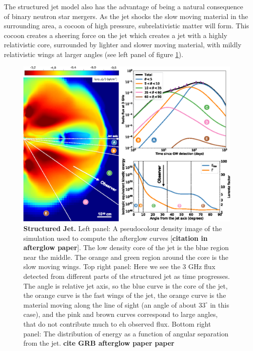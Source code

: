 \documentclass[11pt]{cuthesis}
\begin{document}
The structured jet model also has the advantage of being a natural consequence of binary neutron star mergers. As the jet shocks the slow moving material in the surrounding area, a cocoon of high pressure, subrelativistic matter will form. This cocoon creates a sheering force on the jet which creates a jet with a highly relativistic core, surrounded by lighter and slower moving material, with mildly relativistic wings at larger angles (see left panel of figure \ref{fig:structured jet}). 

\begin{figure} %
\begin{center}
\includegraphics[width=1.0\linewidth]{structured_jet.png}
\end{center}
\caption{\textbf{Structured Jet.} Left panel: A pseudocolour density image of the simulation used to compute the afterglow curves [\textbf{citation in afterglow paper}]. The low density core of the jet is the blue region near the middle. The orange and green region around the core is the slow moving wings.  Top right panel: Here we see the 3 GHz flux detected from different parts of the structured jet as time progresses. The angle is relative jet axis, so the blue curve is the core of the jet, the orange curve is the fast wings of the jet, the orange curve is the material moving along the line of sight (an angle of about $33^\circ$ in this case), and the pink and brown curves correspond to large angles, that do not contribute much to eh observed flux. Bottom right panel: The distribution of energy as a function of angular separation from the jet. \textbf{cite GRB afterglow paper paper} }
\label{fig:structured jet}
\end{figure}
\end{document}
